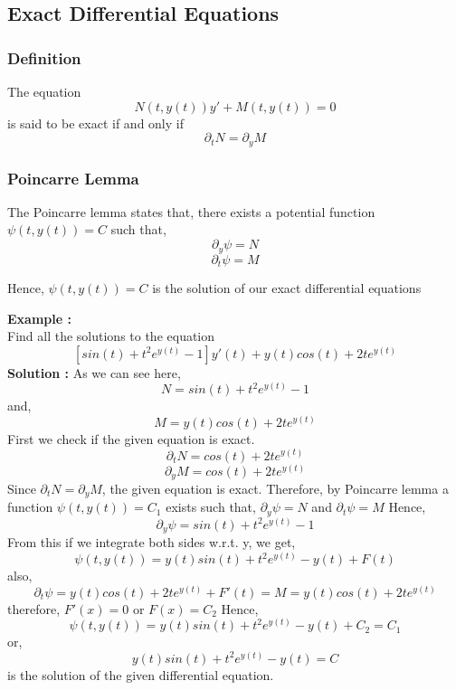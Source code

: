 \documentclass[10pt]{article}
\begin{document}
        \subsection{Exact Differential Equations}
            \subsubsection{Definition}
                The equation 
                $$N(t, y(t))y' + M(t, y(t)) = 0$$
                is said to be exact if and only if
                $$\partial_t N = \partial_yM$$
            \subsubsection{Poincarre Lemma }
                The Poincarre lemma states that, there exists a potential function $\psi(t,y(t)) = C$ such that,
                $$\partial_y\psi = N$$$$\partial_t\psi = M$$
                
                Hence, $\psi(t, y(t)) = C$ is the solution of our exact differential equations
                
                \textbf{Example :}\\
                Find all the solutions to the equation 
                $$[sin(t) + t^2 e^{y(t)} - 1]y'(t) + y(t)cos(t) + 2te^{y(t)}$$
                \textbf{Solution : }
                As we can see here, 
                $$ N = sin(t) + t^2 e^{y(t)} - 1$$
                and,
                $$M = y(t)cos(t) + 2te^{y(t)}$$
                First we check if the given equation is exact.
                $$\partial_tN = cos(t) + 2te^{y(t)}$$
                $$\partial_yM = cos(t) + 2te^{y(t)}$$
                Since $\partial_tN = \partial_yM$, the given equation is exact. Therefore, by Poincarre lemma a function $\psi(t, y(t)) = C_1$ exists such that, $\partial_y\psi=N$ and $\partial_t\psi=M$
                Hence, $$\partial_y\psi = sin(t) + t^2e^{y(t)} - 1$$
                From this if we integrate both sides w.r.t. y, we get,
                $$\psi(t, y(t)) = y(t)sin(t) + t^2e^{y(t)} - y(t) + F(t)$$
                also,
                $$\partial_t\psi = y(t)cos(t) + 2te^{y(t)} + F'(t) = M = y(t)cos(t) + 2te^{y(t)}$$
                therefore, $F'(x) = 0$ or $F(x) = C_2$
                Hence, 
                $$\psi(t, y(t)) = y(t)sin(t) + t^2e^{y(t)} - y(t) + C_2 = C_1$$
                or,
                $$y(t)sin(t) + t^2e^{y(t)} - y(t) = C$$
                is the solution of the given differential equation.
\end{document}
